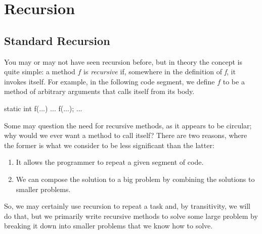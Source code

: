 \section{Recursion}

\subsection{Standard Recursion}
You may or may not have seen recursion before, but in theory the concept is quite simple: a method $f$ is \textit{recursive} if, somewhere in the definition of \textit{f}, it invokes itself. For example, in the following code segment, we define $f$ to be a method of arbitrary arguments that calls itself from its body. 
\begin{verbnobox}[\small]
static int f(...) {
  ...
  f(...);
  ...
}
\end{verbnobox}
Some may question the need for recursive methods, as it appears to be circular; why would we ever want a method to call itself? There are two reasons, where the former is what we consider to be less significant than the latter:
\begin{enumerate}
    \item It allows the programmer to repeat a given segment of code.
    \item We can compose the solution to a big problem by combining the solutions to smaller problems.
\end{enumerate}
So, we may certainly use recursion to repeat a task and, by transitivity, we will do that, but we primarily write recursive methods to solve some large problem by breaking it down into smaller problems that we know how to solve.

